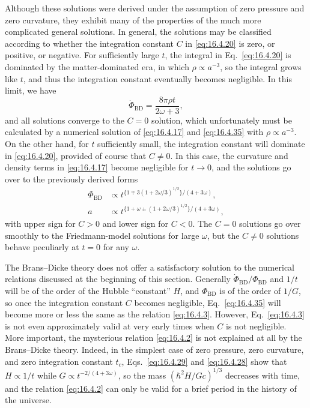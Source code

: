 Although these solutions were derived under the assumption of zero pressure
and zero curvature, they exhibit many of the properties of the much more
complicated general solutions. In general, the solutions may be classified
according to whether the integration constant \(C\) in \eqref{eq:16.4.20} is
zero, or positive, or negative. For sufficiently large \(t\), the integral in
Eq.~\eqref{eq:16.4.20} is dominated by the matter-dominated era, in which
\(\rho\propto a^{-3}\), so the integral grows like \(t\), and thus the
integration constant eventually becomes negligible. In this limit, we have
\begin{equation}
  \dot\Phi_{\mathrm{BD}}
  =
  \frac{8\pi\rho t}{2\omega+3},
  \tag{16.4.35}\label{eq:16.4.35}
\end{equation}
and all solutions converge to the \(C=0\) solution, which unfortunately must
be calculated by a numerical solution of \eqref{eq:16.4.17} and
\eqref{eq:16.4.35} with \(\rho\propto a^{-3}\). On the other hand, for \(t\)
sufficiently small, the integration constant will dominate in
\eqref{eq:16.4.20}, provided of course that \(C\ne0\). In this case, the
curvature and density terms in \eqref{eq:16.4.17} become negligible for
\(t\to0\), and the solutions go over to the previously derived forms
\begin{align}
  \Phi_{\mathrm{BD}}
  &\propto
  t^{\{1\mp3(1+2\omega/3)^{1/2}\}/(4+3\omega)},
  \tag{16.4.36}\label{eq:16.4.36}\\
  a
  &\propto
  t^{\{1+\omega\pm(1+2\omega/3)^{1/2}\}/(4+3\omega)},
  \tag{16.4.37}\label{eq:16.4.37}
\end{align}
with upper sign for \(C>0\) and lower sign for \(C<0\). The \(C=0\) solutions
go over smoothly to the Friedmann-model solutions for large \(\omega\), but
the \(C\ne0\) solutions behave peculiarly at \(t=0\) for any \(\omega\).

The Brans--Dicke theory does not offer a satisfactory solution to the numerical
relations discussed at the beginning of this section. Generally
\(\dot\Phi_{\mathrm{BD}}/\Phi_{\mathrm{BD}}\) and \(1/t\) will be of the order
of the Hubble ``constant'' \(H\), and \(\Phi_{\mathrm{BD}}\) is of the order of
\(1/G\), so once the integration constant \(C\) becomes negligible,
Eq.~\eqref{eq:16.4.35} will become more or less the same as the relation
\eqref{eq:16.4.3}. However, Eq.~\eqref{eq:16.4.3} is not even approximately
valid at very early times when \(C\) is not negligible. More important, the
mysterious relation \eqref{eq:16.4.2} is not explained at all by the
Brans--Dicke theory. Indeed, in the simplest case of zero pressure, zero
curvature, and zero integration constant \(t_c\), Eqs.~\eqref{eq:16.4.29} and
\eqref{eq:16.4.28} show that \(H\propto1/t\) while
\(G\propto t^{-2/(4+3\omega)}\), so the mass
\((\hbar^2H/Gc)^{1/3}\) decreases with time, and the relation
\eqref{eq:16.4.2} can only be valid for a brief period in the history of the
universe.

